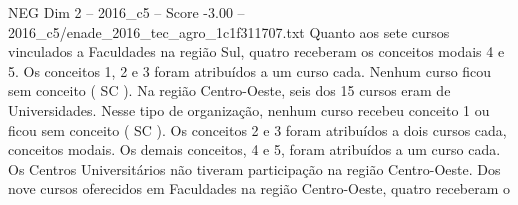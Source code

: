 \begin{textsample}{NEG Dim 2 – 2016\_c5 – Score -3.00 – 2016\_c5/enade\_2016\_tec\_agro\_1c1f311707.txt}
Quanto aos sete cursos vinculados a Faculdades na região Sul, quatro receberam os conceitos modais 4 e 5.
Os conceitos 1, 2 e 3 foram atribuídos a um curso cada.
Nenhum curso ficou sem conceito ( SC ).
Na região Centro-Oeste, seis dos 15 cursos eram de Universidades.
Nesse tipo de organização, nenhum curso recebeu conceito 1 ou ficou sem conceito ( SC ).
Os conceitos 2 e 3 foram atribuídos a dois cursos cada, conceitos modais.
Os demais conceitos, 4 e 5, foram atribuídos a um curso cada.
Os Centros Universitários não tiveram participação na região Centro-Oeste.
Dos nove cursos oferecidos em Faculdades na região Centro-Oeste, quatro receberam o

\end{textsample}
